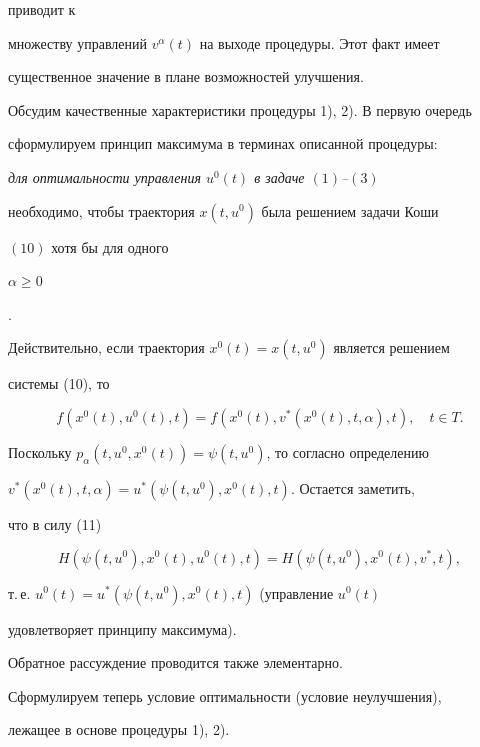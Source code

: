 приводит к 


множеству управлений $v^\alpha(t)$ на выходе процедуры. Этот факт имеет 


существенное значение в плане возможностей улучшения. 


 


Обсудим качественные характеристики процедуры 1), 2). В первую очередь 


сформулируем принцип максимума в терминах описанной процедуры: 


{\it для оптимальности управления $u^0(t)$ в задаче $(1)$--$(3)$ 


необходимо, чтобы траектория $x(t,u^0)$ была решением задачи Коши 


$(10)$ хотя бы для одного 


$\alpha\ge 0$}. 


 


Действительно, если траектория $x^0(t)=x(t,u^0)$ является решением 


системы (10), то 


\begin{equation} 


f(x^0(t),u^0(t),t)=f(x^0(t),v^*(x^0(t),t,\alpha),t), 


\quad t\in T. 


\end{equation} 


Поскольку $p_\alpha(t,u^0,x^0(t))=\psi(t,u^0)$, то согласно определению 


$v^*(x^0(t),t,\alpha)=u^*(\psi(t,u^0),x^0(t),t)$. Остается заметить, 


что в силу (11) 


$$ 


H(\psi(t,u^0),x^0(t),u^0(t),t)= 


H(\psi(t,u^0),x^0(t),v^*,t), 


$$ 


т.\,е.{} $u^0(t)=u^*(\psi(t,u^0),x^0(t),t)$ (управление $u^0(t)$ 


удовлетворяет принципу максимума). 


Обратное рассуждение проводится также элементарно. 


 


Сформулируем теперь условие оптимальности (условие неулучшения), 


лежащее в основе процедуры 1), 2). 


